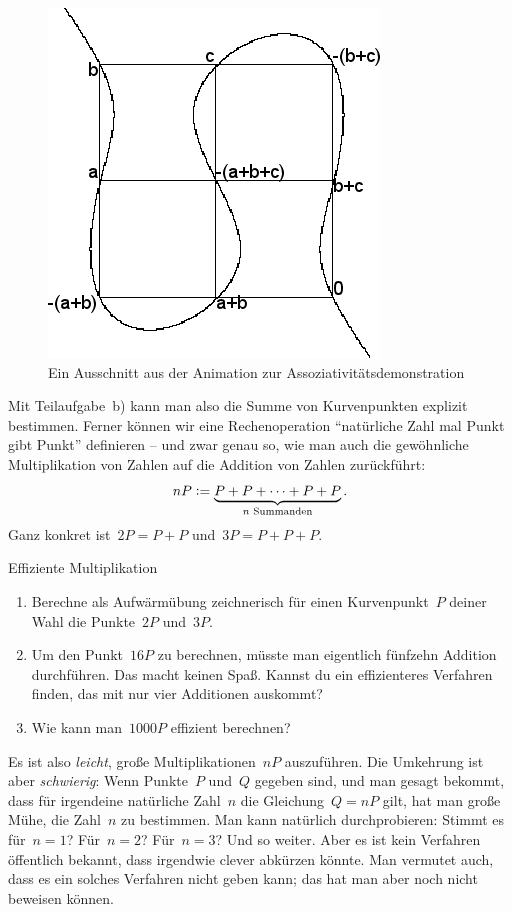 \documentclass{../zirkelblatt}
\newcommand{\defeq}{\vcentcolon=}
\begin{document}
\begin{figure}[t]
  \centering
  \includegraphics[scale=0.4]{elliptic-curve-associativity}
  \caption{Ein Ausschnitt aus der Animation zur Assoziativitätsdemonstration}
\end{figure}

Mit Teilaufgabe~b) kann man also die Summe von Kurvenpunkten explizit
bestimmen. Ferner können wir eine Rechenoperation "`natürliche Zahl mal Punkt
gibt Punkt"' definieren -- und zwar genau so, wie man auch die gewöhnliche
Multiplikation von Zahlen auf die Addition von Zahlen zurückführt:
\[ n P \defeq \underbrace{P + P + \cdots + P + P}_{\text{$n$ Summanden}}. \]
Ganz konkret ist~$2 P = P + P$ und~$3 P = P + P + P$.

\begin{aufgabeShaded}{Effiziente Multiplikation}
\begin{enumerate}
\item Berechne als Aufwärmübung zeichnerisch für einen Kurvenpunkt~$P$ deiner Wahl die
Punkte~$2P$ und~$3P$.
\item Um den Punkt~$16P$ zu berechnen, müsste man eigentlich fünfzehn Addition
durchführen. Das macht keinen Spaß. Kannst du ein effizienteres Verfahren
finden, das mit nur vier Additionen auskommt?
\item Wie kann man~$1000P$ effizient berechnen?
\end{enumerate}
\end{aufgabeShaded}

Es ist also \emph{leicht}, große Multiplikationen~$nP$ auszuführen. Die
Umkehrung ist aber \emph{schwierig}: Wenn Punkte~$P$ und~$Q$ gegeben sind, und
man gesagt bekommt, dass für irgendeine natürliche Zahl~$n$ die Gleichung~$Q =
nP$ gilt, hat man große Mühe, die Zahl~$n$ zu bestimmen. Man kann natürlich
durchprobieren: Stimmt es für~$n = 1$? Für~$n = 2$? Für~$n = 3$? Und so weiter.
Aber es ist kein Verfahren öffentlich bekannt, dass irgendwie clever abkürzen
könnte. Man vermutet auch, dass es ein solches Verfahren nicht geben kann; das
hat man aber noch nicht beweisen können.
\end{document}
